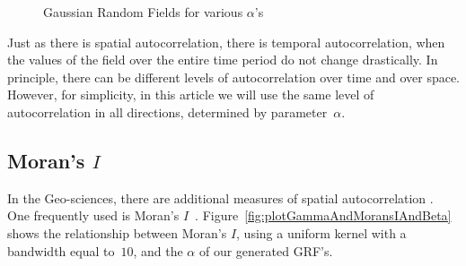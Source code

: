 \documentclass[ijgi,article,submit,moreauthors,pdftex,10pt,a4paper]{Definitions/mdpi}
\begin{document}
\begin{figure}[H]
\hspace{8mm}
\caption{Gaussian Random Fields for various $\alpha$'s}
\label{fig:GaussianRandomField}
\end{figure}

Just as there is spatial autocorrelation, there is temporal autocorrelation, when the values of the field over the entire time period do not change drastically. In principle, there can be different levels of autocorrelation over time and over space. However, for simplicity, in this article we will use the same level of autocorrelation in all directions, determined by parameter~$\alpha$.

\subsection{Moran's $I$}
\label{sec:Autocorrelation/ Morans I}
In the Geo-sciences, there are additional measures of spatial autocorrelation \cite{Eshel2011, Storch1999}. One frequently used is Moran's $I$~\cite{Moran1950, Hubert1981, PySAL}. Figure~\ref{fig:plotGammaAndMoransIAndBeta} shows the relationship between Moran's $I$, using a uniform kernel with a bandwidth equal to~$10$, and the $\alpha$ of our generated GRF's.
\end{document}
